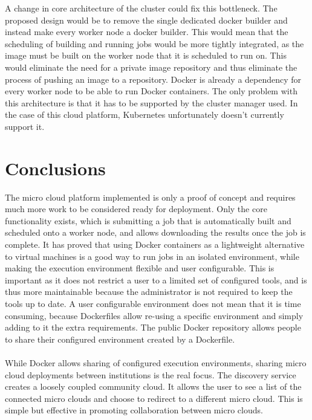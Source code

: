 \documentclass{sig-alternate-05-2015}
\begin{document}
A change in core architecture of the cluster could fix this bottleneck. The proposed design would be to remove the single dedicated docker builder and instead make every worker node a docker builder. This would mean that the scheduling of building and running jobs would be more tightly integrated, as the image must be built on the worker node that it is scheduled to run on. This would eliminate the need for a private image repository and thus eliminate the process of pushing an image to a repository. Docker is already a dependency for every worker node to be able to run Docker containers. The only problem with this architecture is that it has to be supported by the cluster manager used. In the case of this cloud platform, Kubernetes unfortunately doesn't currently support it. 

\section{Conclusions}
The micro cloud platform implemented is only a proof of concept and requires much more work to be considered ready for deployment. Only the core functionality exists, which is submitting a job that is automatically built and scheduled onto a worker node, and allows downloading the results once the job is complete. It has proved that using Docker containers as a lightweight alternative to virtual machines is a good way to run jobs in an isolated environment, while making the execution environment flexible and user configurable. This is important as it does not restrict a user to a limited set of configured tools, and is thus more maintainable because the administrator is not required to keep the tools up to date. A user configurable environment does not mean that it is time consuming, because Dockerfiles allow re-using a specific environment and simply adding to it the extra requirements. The public Docker repository allows people to share their configured environment created by a Dockerfile. 
\\\\
While Docker allows sharing of configured execution environments, sharing micro cloud deployments between institutions is the real focus. The discovery service creates a loosely coupled community cloud. It allows the user to see a list of the connected micro clouds and choose to redirect to a different micro cloud. This is simple but effective in promoting collaboration between micro clouds.
\end{document}
